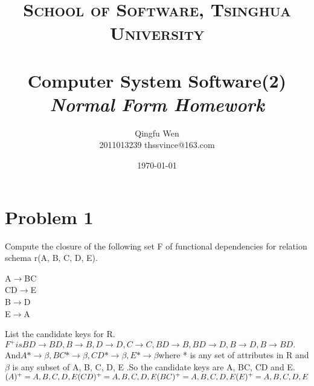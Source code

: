 \documentclass[paper=a4, fontsize=11pt]{scrartcl} %
\title{	
\normalfont \normalsize
\textsc{School of Software, Tsinghua University} \\ [25pt] %
\horrule{0.5pt} \\[0.4cm] %
\huge Computer System Software(2)\\ %
\LARGE\textit{Normal Form Homework}
\horrule{2pt} \\[0.5cm] %
}
\author{Qingfu Wen \\ \normalsize 2011013239 thssvince@163.com} %
\date{\normalsize\today} %
\numberwithin{equation}{section} %
\numberwithin{figure}{section} %
\numberwithin{table}{section} %
\begin{document}
\maketitle %
\newpage

\section{Problem 1}
Compute the closure of the following set F of functional dependencies for relation schema r(A, B, C, D, E).
\begin{center}
A$\rightarrow$BC\\
CD$\rightarrow$E\\
B$\rightarrow$D\\
E$\rightarrow$A
\end{center}
List the candidate keys for R. \\
$F^{+} is BD\rightarrow BD, B\rightarrow B,D\rightarrow D,C\rightarrow C,BD\rightarrow B, BD\rightarrow D,B\rightarrow D, B\rightarrow BD.$ And$ A*\rightarrow \beta, BC*\rightarrow \beta, CD*\rightarrow \beta, E*\rightarrow \beta $where * is any set of attributes in R and $\beta$ is  any subset of { A, B, C, D, E }.So the candidate keys are A, BC, CD and E.\\
$(A)^{+} = {A,B,C,D,E} \\
(CD)^{+} = {A,B,C,D,E}  \\
(BC)^{+} = {A,B,C,D,E}  \\
(E)^{+} = {A,B,C,D,E}$
\end{document}
